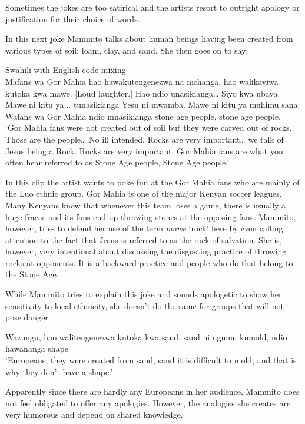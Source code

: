 \documentclass[output=paper]{langsci/langscibook}
\begin{document}
Sometimes the jokes are too satirical and the artists resort to outright apology or justification for their choice of words. 

In this next joke Mammito talks about human beings having been created from various types of soil: loam, clay, and sand. She then goes on to say:

\ea
{Swahili with English code-mixing}\\
Mafans wa Gor Mahia hao hawakutengenezwa na mchanga, hao walikaviwa kutoka kwa mawe. \textup{[Loud laughter.]} Hao ndio unasikianga… Siyo kwa ubaya. Mawe ni kitu ya... tunasikianga Yesu ni mwamba. Mawe ni kitu ya muhimu sana. Wafans wa Gor Mahia ndio mnasikianga stone age people, stone age people.\\
\glt ‘Gor Mahia fans were not created out of soil but they were carved out of rocks. Those are the people… No ill intended. Rocks are very important… we talk of Jesus being a Rock. Rocks are very important. Gor Mahia fans are what you often hear referred to as Stone Age people, Stone Age people.’ \citep{ChurchillRaw2014}
\z

In this clip the artist wants to poke fun at the Gor Mahia fans who are mainly of the Luo ethnic group. Gor Mahia is one of the major Kenyan soccer leagues. Many Kenyans know that whenever this team loses a game, there is usually a huge fracas and its fans end up throwing stones at the opposing fans. Mammito, however, tries to defend her use of the term \textit{mawe }‘rock’ here by even calling attention to the fact that Jesus is referred to as the rock of salvation. She is, however, very intentional about discussing the disgusting practice of throwing rocks at opponents. It is a backward practice and people who do that belong to the Stone Age.

While Mammito tries to explain this joke and sounds apologetic to show her sensitivity to local ethnicity, she doesn’t do the same for groups that will not pose danger. 
 
\ea
 Wazungu, hao walitengenezwa kutoka kwa sand, sand ni ngumu kumold, ndio hawananga shape \\
\glt ‘Europeans, they were created from sand, sand it is difficult to mold, and that is why they don’t have a shape.’ \citep{ChurchillRaw2014}
\z

Apparently since there are hardly any Europeans in her audience, Mammito does not feel obligated to offer any apologies. However, the analogies she creates are very humorous and depend on shared knowledge. 
\end{document}
